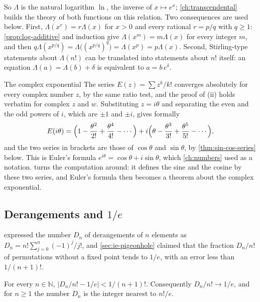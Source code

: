 So $\Lambda$ is the natural logarithm $\ln$, the inverse of $x\mapsto e^x$; \cref{ch:transcendental} builds the theory of both functions on this relation. Two consequences are used below. First, $\Lambda(x^r)=r\Lambda(x)$ for $x>0$ and every rational $r=p/q$ with $q\ge1$: \cref{prop:log-additive} and induction give $\Lambda(x^m)=m\Lambda(x)$ for every integer $m$, and then $q\Lambda(x^{p/q})=\Lambda\bigl((x^{p/q})^q\bigr)=\Lambda(x^p)=p\Lambda(x)$. Second, Stirling-type statements about $\Lambda(n!)$ can be translated into statements about $n!$ itself: an equation $\Lambda(a)=\Lambda(b)+\delta$ is equivalent to $a=b\,e^\delta$.

\begin{note}{The complex exponential}
The series $E(z)=\sum z^k/k!$ converges absolutely for every complex number $z$, by the same ratio test, and the proof of (ii) holds verbatim for complex $z$ and $w$. Substituting $z=i\theta$ and separating the even and the odd powers of $i$, which are $\pm1$ and $\pm i$, gives formally
\[
E(i\theta)=\Bigl(1-\frac{\theta^2}{2!}+\frac{\theta^4}{4!}-\cdots\Bigr)+i\Bigl(\theta-\frac{\theta^3}{3!}+\frac{\theta^5}{5!}-\cdots\Bigr),
\]
and the two series in brackets are those of $\cos\theta$ and $\sin\theta$, by \cref{thm:sin-cos-series} below. This is Euler's formula $e^{i\theta}=\cos\theta+i\sin\theta$, which \cref{ch:numbers} used as a notation.  turns the computation around: it defines the sine and the cosine by these two series, and Euler's formula then becomes a theorem about the complex exponential.
\end{note}

\subsection{Derangements and \texorpdfstring{$1/e$}{1/e}}

 expressed the number $D_n$ of derangements of $n$ elements as $D_n=n!\sum_{j=0}^n(-1)^j/j!$, and \cref{sec:ie-pigeonhole} claimed that the fraction $D_n/n!$ of permutations without a fixed point tends to $1/e$, with an error less than $1/(n+1)!$.

\begin{proposition}
\label{prop:derangements-limit}
For every $n\in\mathbb N$, $\bigl|D_n/n!-1/e\bigr|<1/(n+1)!$. Consequently $D_n/n!\to1/e$, and for $n\ge1$ the number $D_n$ is the integer nearest to $n!/e$.
\end{proposition}

